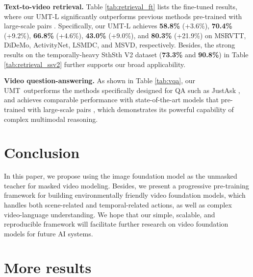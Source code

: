 \documentclass[10pt,twocolumn,letterpaper]{article}
\def\Modelnamelight{UMT}
\begin{document}
\textbf{Text-to-video retrieval.}
Table \ref{tab:retrieval_ft} lists the fine-tuned results, 
where our \Modelnamelight-L significantly outperforms previous methods pre-trained with large-scale pairs \cite{clip4clip,xue2022clip,Wang2022InternVideoGV}. Specifically, 
our \Modelnamelight-L achieves \textbf{58.8\%} (+3.6\%), \textbf{70.4\%} (+9.2\%), \textbf{66.8\%} (+4.6\%), \textbf{43.0\%} (+9.0\%), and \textbf{80.3\%} (+21.9\%) on MSRVTT, DiDeMo, ActivityNet, LSMDC, and MSVD, respectively. 
Besides, 
the strong results on the temporally-heavy SthSth V2 dataset (\textbf{73.3\%} and \textbf{90.8\%}) in Table \ref{tab:retrieval_ssv2} further supports our broad applicability.

\textbf{Video question-answering.}
As shown in Table \ref{tab:vqa},
our \Modelnamelight\  outperforms the methods specifically designed for QA such as JustAsk \cite{yang2021just}, 
and achieves comparable performance with state-of-the-art models that pre-trained with large-scale pairs \cite{yang2022zero,Wang2022InternVideoGV,videococa},
which demonstrates its powerful capability of complex multimodal reasoning. \section{Conclusion}
In this paper, 
we propose using the image foundation model as the unmasked teacher for masked video modeling.
Besides,
we present a progressive pre-training framework for building environmentally friendly video foundation models,
which handles both scene-related and temporal-related actions, 
as well as complex video-language understanding. 
We hope that our simple, scalable, and reproducible framework will facilitate further research on video foundation models for future AI systems. 

{\small


}


\newpage
\appendix





\section{More results}
\end{document}
